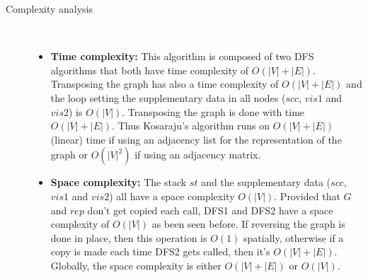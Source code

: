 \documentclass{article}
\begin{document}
\begin{description}
\item[Complexity analysis]\
\begin{itemize}
    \item \textbf{Time complexity:} This algorithm is composed of two DFS algorithms that both have time complexity of $O(|V|+|E|)$. Transposing the graph has also a time complexity of $O(|V|+|E|)$ and the loop setting the supplementary data in all nodes ($scc$, $vis1$ and $vis2$) is $O(|V|)$. Transposing the graph is done with time $O(|V|+|E|)$. Thus Kosaraju's algorithm runs on $O(|V|+|E|)$ (linear) time if using an adjacency list for the representation of the graph or $O(|V|^2)$ if using an adjacency matrix.
    \item \textbf{Space complexity:} The stack $st$ and the supplementary data ($scc$, $vis1$ and $vis2$) all have a space complexity $O(|V|)$. Provided that $G$ and $rep$ don't get copied each call, DFS1 and DFS2 have a space complexity of $O(|V|)$ as been seen before. If reversing the graph is done in place, then this operation is $O(1)$ spatially, otherwise if a copy is made each time DFS2 gets called, then it's $O(|V|+|E|)$. Globally, the space complexity is either $O(|V|+|E|)$ or $O(|V|)$.
\end{itemize}
\end{description}
\newpage
\end{document}
